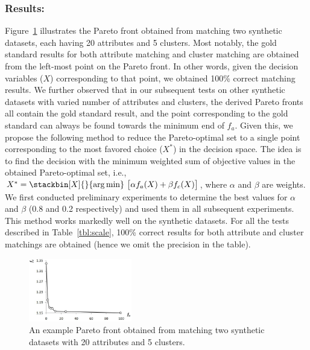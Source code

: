\subsubsection{Results:}
Figure~\ref{fig:syn_pareto} illustrates the Pareto front obtained from matching two synthetic datasets, each having 20 attributes and 5 clusters. Most notably, the gold standard results for both attribute matching and cluster matching are obtained from the left-most point on the Pareto front. In other words, given the decision variables ($X$) corresponding to that point, we obtained 100\% correct matching results. We further observed that in our subsequent tests on other synthetic datasets with varied number of attributes and clusters, the derived Pareto fronts all contain the gold standard result, and the point corresponding to the gold standard can always be found towards the minimum end of $f_a$. Given this, we propose the following method to reduce the Pareto-optimal set to a single point corresponding to the most favored choice ($X^*$) in the decision space. The idea is to find the decision with the minimum weighted sum of objective values in the obtained Pareto-optimal set, i.e., $X^*=\stackbin[X]{}{\argmin}~\big[\alpha f_a(X)+\beta f_c(X)\big]$, where $\alpha$ and $\beta$ are weights. We first conducted preliminary experiments to determine the best values for $\alpha$ and $\beta$ (0.8 and 0.2 respectively) and used them in all subsequent experiments. This method works markedly well on the synthetic datasets. For all the tests described in Table~\ref{tbl:scale}, 100\% correct results for both attribute and cluster matchings are obtained (hence we omit the precision in the table).
\begin{figure}[tb]
\begin{center}
\includegraphics[width=0.4\textwidth]{fig/syn_pareto.eps}
\end{center}
\caption{\label{fig:syn_pareto} An example Pareto front obtained from matching two synthetic datasets with 20 attributes and 5 clusters.}
\end{figure}

